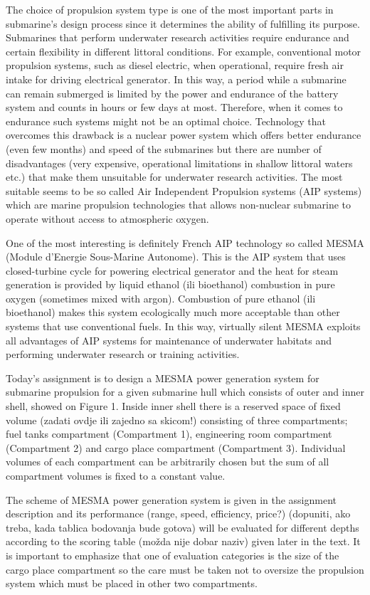 \documentclass{article}
\begin{document}
	The choice of propulsion system type is one of the most important parts in submarine’s design process since it determines the ability of fulfilling its purpose. Submarines that perform underwater research activities require endurance and certain flexibility in different littoral conditions. For example, conventional motor propulsion systems, such as diesel electric, when operational, require fresh air intake for driving electrical generator. In this way, a period while a submarine can remain submerged is limited by the power and endurance of the battery system and counts in hours or few days at most. Therefore, when it comes to endurance such systems might not be an optimal choice. Technology that overcomes this drawback is a nuclear power system which offers better endurance (even few months) and speed of the submarines but there are number of disadvantages (very expensive, operational limitations in shallow littoral waters etc.) that make them unsuitable for underwater research activities. The most suitable seems to be so called Air Independent Propulsion systems (AIP systems) which are marine propulsion technologies that allows non-nuclear submarine to operate without access to atmospheric oxygen. 
	
	One of the most interesting is definitely French AIP technology so called MESMA (Module d'Energie Sous-Marine Autonome). This is the AIP system that uses closed-turbine cycle for powering electrical generator and the heat for steam generation is provided by liquid ethanol (ili bioethanol) combustion in pure oxygen (sometimes mixed with argon). Combustion of pure ethanol (ili bioethanol) makes this system ecologically much more acceptable than other systems that use conventional fuels. In this way, virtually silent MESMA exploits all advantages of AIP systems for maintenance of underwater habitats and performing underwater research or training activities.
	 
	Today's assignment is to design a MESMA power generation system for submarine propulsion for a given submarine hull which consists of outer and inner shell, showed on Figure 1. Inside inner shell there is a reserved space of fixed volume (zadati ovdje ili zajedno sa skicom!) consisting of three compartments; fuel tanks compartment (Compartment 1), engineering room compartment (Compartment 2) and cargo place compartment (Compartment 3). Individual volumes of each compartment can be arbitrarily chosen but the sum of all compartment volumes is fixed to a constant value. 
	
	The scheme of MESMA power generation system is given in the assignment description and its performance (range, speed, efficiency, price?) (dopuniti, ako treba, kada tablica bodovanja bude gotova) will be evaluated for different depths according to the scoring table (možda nije dobar naziv) given later in the text. It is important to emphasize that one of evaluation categories is the size of the cargo place compartment so the care must be taken not to oversize the propulsion system which must be placed in other two compartments.
	
\end{document}
